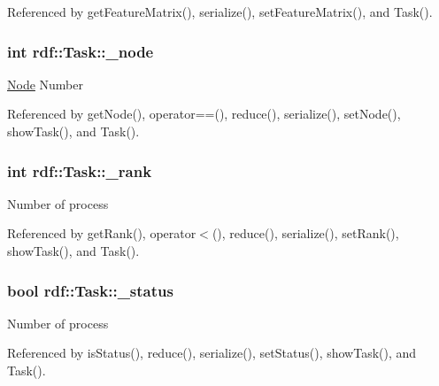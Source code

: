 Referenced by get\+Feature\+Matrix(), serialize(), set\+Feature\+Matrix(), and Task().

\subsubsection[{\texorpdfstring{\+\_\+node}{_node}}]{\setlength{\rightskip}{0pt plus 5cm}int rdf\+::\+Task\+::\+\_\+node\hspace{0.3cm}{\ttfamily [private]}}\hypertarget{classrdf_1_1Task_ab505294f64848a3ee104c9efa45528b5}{}\label{classrdf_1_1Task_ab505294f64848a3ee104c9efa45528b5}
\hyperlink{classrdf_1_1Node}{Node} Number 

Referenced by get\+Node(), operator==(), reduce(), serialize(), set\+Node(), show\+Task(), and Task().

\subsubsection[{\texorpdfstring{\+\_\+rank}{_rank}}]{\setlength{\rightskip}{0pt plus 5cm}int rdf\+::\+Task\+::\+\_\+rank\hspace{0.3cm}{\ttfamily [private]}}\hypertarget{classrdf_1_1Task_a66806490016907e1acd9ad771811e4d5}{}\label{classrdf_1_1Task_a66806490016907e1acd9ad771811e4d5}
Number of process 

Referenced by get\+Rank(), operator$<$(), reduce(), serialize(), set\+Rank(), show\+Task(), and Task().

\subsubsection[{\texorpdfstring{\+\_\+status}{_status}}]{\setlength{\rightskip}{0pt plus 5cm}bool rdf\+::\+Task\+::\+\_\+status\hspace{0.3cm}{\ttfamily [private]}}\hypertarget{classrdf_1_1Task_a43face20dfc0d868ef400070d0fd43bb}{}\label{classrdf_1_1Task_a43face20dfc0d868ef400070d0fd43bb}
Number of process 

Referenced by is\+Status(), reduce(), serialize(), set\+Status(), show\+Task(), and Task().

